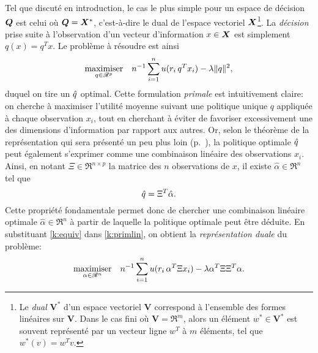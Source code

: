 Tel que discuté en introduction, le cas le plus simple pour un espace de décision $\Q$ est
celui où $\Q = \X^*$, c'est-à-dire le dual de l'espace vectoriel $\X$\footnote{Le
  \textit{dual} $\bm V^*$ d'un espace vectoriel $\bm V$ correspond à l'ensemble des formes
  linéaires sur $\bm V$. Dans le cas fini où $\bm V = \Re^m$, alors un élément
  $w^* \in \bm V^*$ est souvent représenté par un vecteur ligne $w^T$ à $m$ éléments, tel
  que $w^*(v) = w^Tv.$}. La \textit{décision} prise suite à l'observation d'un vecteur
d'information $x\in\X$ est simplement $q(x) = q^Tx$. Le problème à résoudre est ainsi
\begin{equation}
  \label{k:primlin}
  \maximizeEquation[q\in\Re^p]{n^{-1}\sumi u(r_i\,q^Tx_i) - \lambda\|q\|^2,}
\end{equation}
duquel on tire un $\qh$ optimal. Cette formulation \textit{primale} est intuitivement
claire: on cherche à maximiser l'utilité moyenne suivant une politique unique $q$
appliquée à chaque observation $x_i$, tout en cherchant à éviter de favoriser
excessivement une des dimensions d'information par rapport aux autres. Or, selon le
théorème de la représentation qui sera présenté un peu plus loin (p.~\pageref{k:thmrep}),
la politique optimale $\qh$ peut également s'exprimer comme une combinaison linéaire des
observations $x_i$. Ainsi, en notant $\Xi \in \Re^{n \times p}$ la matrice des $n$ observations de
$x$, il existe $\hat\alpha \in \Re^n$ tel que
\begin{equation}
  \label{k:equiv}
  \qh = \Xi^T\hat\alpha.
\end{equation}
Cette propriété fondamentale permet donc de chercher une combinaison linéaire optimale
$\hat\alpha \in \Re^n$ à partir de laquelle la politique optimale peut être déduite. En substituant
\eqref{k:equiv} dans \eqref{k:primlin}, on obtient la \textit{représentation duale} du
problème:
\begin{equation}
  \maximizeEquation[\alpha\in\Re^n]{n^{-1}\sumi u(r_i\,\alpha^T\Xi x_i) - \lambda \alpha^T\Xi\Xi^T\alpha.}
\end{equation}

